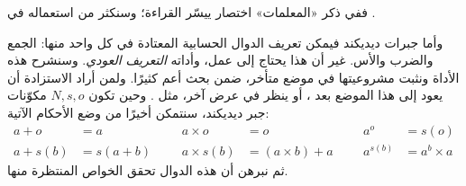 \documentclass[../../../include/open-logic-section]{subfiles}
\begin{document}
ففي ذكر «المعلمات» اختصار ييسّر القراءة؛ وسنكثر من استعماله في
.

وأما جبرات ديديكند فيمكن تعريف الدوال الحسابية المعتادة في كل واحد منها: الجمع والضرب والأس. غير أن هذا يحتاج إلى عمل، وأداته
\emph{التعريف العودي}. وسنشرح هذه الأداة ونثبت مشروعيتها في موضع متأخر، ضمن بحث أعم كثيرًا. ولمن أراد الاستزادة أن يعود إلى هذا الموضع بعد
، أو ينظر في عرض آخر، مثل
\citealt[صص.~95--8]{Potter2004}. وحين تكون $N, s, o$ مكوّنات جبر ديديكند، سنتمكن أخيرًا من وضع الأحكام الآتية:
\begin{align*}
	{a} + {o} &= {a} & & & {a} \times {o} &= {o} & & & {a}^{o} &= s(o)\\
{a} + {s}({b}) &= {s}({a}+{b}) &&& {a} \times {s}({b}) &= ({a}\times {b}) + {a}  & & & {a}^{{s}({b})} &= {a}^{b} \times {a}
\end{align*}
ثم نبرهن أن هذه الدوال تحقق الخواص المنتظرة منها.
\end{document}
